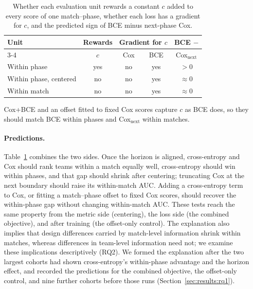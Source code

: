 \documentclass[sigconf,anonymous,nonacm]{acmart}
\begin{document}
\begin{table}[t]
\centering\footnotesize
\caption{Whether each evaluation unit rewards a constant $c$ added to every score of one match--phase, whether each loss has a gradient for $c$, and the predicted sign of BCE minus next-phase Cox.}
\label{tab:account}
\setlength{\tabcolsep}{3pt}
\begin{tabular}{lcccc}
\toprule
Unit & Rewards & \multicolumn{2}{c}{Gradient for $c$} & BCE $-$ \\
\cmidrule(lr){3-4}
 & $c$ & Cox & BCE & Cox$_{\mathrm{next}}$ \\
\midrule
Within phase & yes & no & yes & $>0$ \\
Within phase, centered & no & no & yes & $\approx0$ \\
Within match & no & no & yes & $\approx0$ \\
\bottomrule
\end{tabular}
\smallskip
\parbox{\columnwidth}{\scriptsize Cox+BCE and an offset fitted to fixed Cox scores capture $c$ as BCE does, so they should match BCE within phases and Cox$_{\mathrm{next}}$ within matches.}
\end{table}

\paragraph{Predictions.}
Table~\ref{tab:account} combines the two sides. Once the horizon is aligned, cross-entropy and Cox should rank teams within a match equally well, cross-entropy should win within phases, and that gap should shrink after centering; truncating Cox at the next boundary should raise its within-match AUC. Adding a cross-entropy term to Cox, or fitting a match--phase offset to fixed Cox scores, should recover the within-phase gap without changing within-match AUC. These tests reach the same property from the metric side (centering), the loss side (the combined objective), and after training (the offset-only control). The explanation also implies that design differences carried by match-level information shrink within matches, whereas differences in team-level information need not; we examine these implications descriptively (RQ2). We formed the explanation after the two largest cohorts had shown cross-entropy's within-phase advantage and the horizon effect, and recorded the predictions for the combined objective, the offset-only control, and nine further cohorts before those runs (Section~\ref{sec:results:rq1}).

\end{document}
